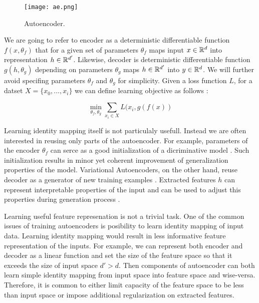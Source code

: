 \begin{figure}[h!]
  \centering
    \texttt{[image: ae.png]}
  \caption{Autoencoder.}
  \label{fig:ae}
\end{figure}



We are going to refer to encoder as a deterministic differentiable function $f(x, \theta_f)$ that for a given set of parameters $\theta_f$ maps input $x\in \Bbb{R}^d$ into representation $h \in \Bbb{R}^{d'}$.
Likewise, decoder is deterministic differentiable function $g(h, \theta_g)$ depending on parameters $\theta_g$ maps $h\in\Bbb{R}^{d'}$ into $y\in \Bbb{R}^d$. We will further avoid specifing parameters $\theta_f$ and $\theta_g$ for simplicity.
Given a loss function $L$, for a datset $X=\{x_0, ..., x_i\}$ we can define learning objective as follows \cite{Good2016}:

\begin{equation}\label{eq:ae}
\min_{\theta_f, \theta_g}\sum\limits_{x_i \in X}{L(x_i, g(f(x))}
\end{equation}

Learning identity mapping itself is not particulaly usefull.
Instead we are often interested in reusing only parts of the autoencoder.
For example, parameters of the encoder $\theta_f$ can serce as a good initialization of a dicriminative model \cite{Masci2011, Vincent2010, Zhao2015}.
Such initialization results in minor yet coherent improvement of generalization properties of the model.
Variational Autoencoders, on the other hand, reuse decoder as a generator of new training examples \cite{Kingma2013}.
Extracted features $h$ can represent interpretable properties of the input and can be used to adjust this
properties during generation process \cite{Kulkarni2015, Whitney2016}.

Learning useful feature represenation is not a trivial task.
One of the common issues of training autoencoders is posibility to learn identity mapping of input data.
Learning identity mapping would result in less informative feature representation of the inputs.
For example, we can represent both encoder and decoder as a linear function and set the size of the feature space so that it exceeds the size of input space $d' > d$.
Then components of autoencoder can both learn simple identity mapping from input space into feature space and wise-versa.
Therefore, it is common to either limit capacity of the feature space to be less than input space or impose additional regularization on extracted features.

